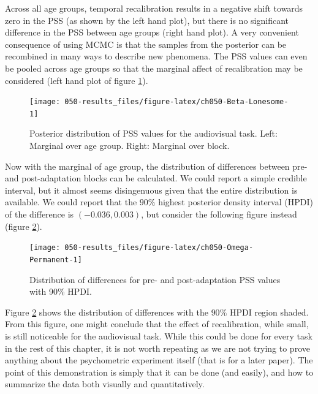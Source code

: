 \documentclass[11pt, oneside, openany]{scrbook}
\begin{document}
Across all age groups, temporal recalibration results in a negative shift towards zero in the PSS (as shown by the left hand plot), but there is no significant difference in the PSS between age groups (right hand plot). A very convenient consequence of using MCMC is that the samples from the posterior can be recombined in many ways to describe new phenomena. The PSS values can even be pooled across age groups so that the marginal affect of recalibration may be considered (left hand plot of figure \ref{fig:ch050-Beta-Lonesome}).

\begin{figure}

{\centering \texttt{[image: 050-results\_files/figure-latex/ch050-Beta-Lonesome-1]} 

}

\caption{Posterior distribution of PSS values for the audiovisual task. Left: Marginal over age group. Right: Marginal over block.}\label{fig:ch050-Beta-Lonesome}
\end{figure}

Now with the marginal of age group, the distribution of differences between pre- and post-adaptation blocks can be calculated. We could report a simple credible interval, but it almost seems disingenuous given that the entire distribution is available. We could report that the \(90\%\) highest posterior density interval (HPDI) of the difference is \((-0.036, 0.003)\), but consider the following figure instead (figure \ref{fig:ch050-Omega-Permanent}).

\begin{figure}

{\centering \texttt{[image: 050-results\_files/figure-latex/ch050-Omega-Permanent-1]} 

}

\caption{Distribution of differences for pre- and post-adaptation PSS values with 90\% HPDI.}\label{fig:ch050-Omega-Permanent}
\end{figure}

Figure \ref{fig:ch050-Omega-Permanent} shows the distribution of differences with the \(90\%\) HPDI region shaded. From this figure, one might conclude that the effect of recalibration, while small, is still noticeable for the audiovisual task. While this could be done for every task in the rest of this chapter, it is not worth repeating as we are not trying to prove anything about the psychometric experiment itself (that is for a later paper). The point of this demonstration is simply that it can be done (and easily), and how to summarize the data both visually and quantitatively.
\end{document}
